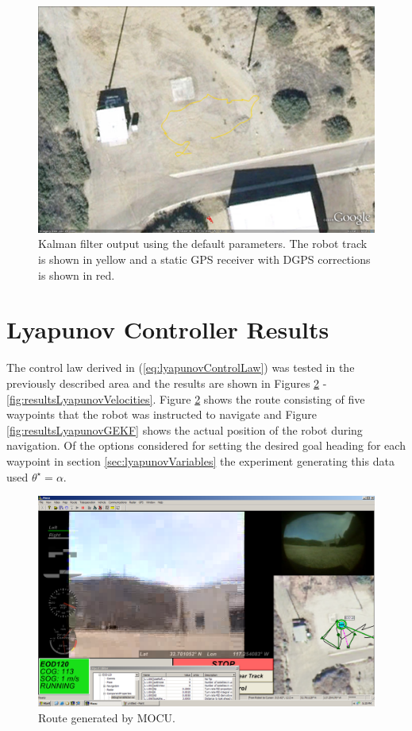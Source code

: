 \begin{figure}[ht!]
	\centering
	\includegraphics[width=.95\textwidth]{images/kfPlainDataFirstAttempt}
	\caption{Kalman filter output using the default parameters. The robot track is shown in yellow and a static GPS receiver with DGPS corrections is shown in red.}
	\label{fig:kfPlainDataFirstAttempt}
\end{figure}

\section{Lyapunov Controller Results}
\label{sec:lyapunovResults}
The control law derived in (\ref{eq:lyapunovControlLaw}) was tested in the previously described area and the results are shown in Figures \ref{fig:resultsLyapunovMocu} - \ref{fig:resultsLyapunovVelocities}. Figure \ref{fig:resultsLyapunovMocu} shows the route consisting of five waypoints that the robot was instructed to navigate and Figure \ref{fig:resultsLyapunovGEKF} shows the actual position of the robot during navigation. Of the options considered for setting the desired goal heading for each waypoint in section \ref{sec:lyapunovVariables} the experiment generating this data used $\theta^\star=\alpha$.

\begin{figure}[ht!]
	\centering
	\includegraphics[width=.5\textwidth]{images/20100918_1717_mocu}
	\caption{Route generated by MOCU.}
	\label{fig:resultsLyapunovMocu}
\end{figure}

